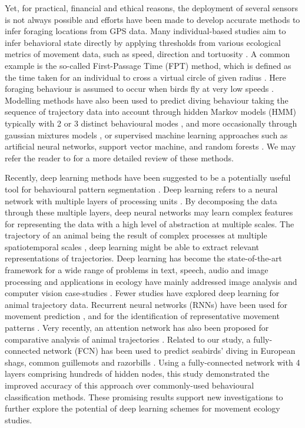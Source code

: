 \documentclass{article}
\begin{document}
Yet, for practical, financial and ethical reasons, the deployment of several sensors is not always possible and efforts have been made to develop accurate methods to infer foraging locations from GPS data. 
Many individual-based studies aim to infer behavioral state directly by applying thresholds from various ecological metrics of movement data, such as speed, direction and tortuosity \citep{dean_simultaneous_2015,seidel_ecological_2018}. 
A common example is the so-called First-Passage Time (FPT) method, which is defined as the time taken for an individual to cross a virtual circle of given radius \citep{carter_navigating_2016}. Here foraging behaviour is assumed to occur when birds fly at very low speeds \citep{weimerskirch_foraging_2008}.
Modelling methods have also been used to predict diving behaviour taking the sequence of trajectory data into account through hidden Markov models (HMM) typically with 2 or 3 distinct behavioural modes \citep{boyd_movement_2014,mcclintock_momentuhmm_2018,oppel_foraging_2015}, and more occasionally through gaussian mixtures models \citep{guilford_gps_2008,mendez_geographical_2017}, or supervised machine learning approaches such as artificial neural networks, support vector machine, and random forests \citep{guilford_migration_2009, wang_machine_2019}. We may refer the reader to 
\citep{joo_navigating_2020} for a more detailed review of these methods.

Recently, deep learning methods have been suggested to be a potentially useful tool for behavioural pattern segmentation \citep{valletta_applications_2017}.
Deep learning refers to a neural network with multiple layers of processing units \citep{lecun_deep_2015}.
By decomposing the data through these multiple layers, deep neural networks may learn complex features for representing the data with a high level of abstraction at multiple scales.
The trajectory of an animal being the result of complex processes at multiple spatiotemporal scales \citep{nathan_movement_2008}, deep learning might be able to extract relevant representations of trajectories.
Deep learning has become the state-of-the-art framework for a wide range of problems in text, speech, audio and image processing and applications in ecology have mainly addressed image analysis and computer vision case-studies \citep{weinstein_computer_2018, christin_applications_2019}. 
Fewer studies have explored deep learning for animal trajectory data.
Recurrent neural networks (RNNs) have been used for movement prediction \citep{ardakani_encoding_2017,rew_animal_2019}, and for the identification of representative movement patterns \citep{peng_deep_2019}. Very recently, an attention network has also been proposed for comparative analysis of  animal trajectories
\citep{maekawa_deep_2020}.
Related to our study, a fully-connected network (FCN) has been used to predict seabirds' diving in European shags, common guillemots and razorbills  \citep{browning_predicting_2018}. Using a fully-connected network with 4 layers comprising hundreds of hidden nodes, this study demonstrated the improved accuracy of this approach over commonly-used behavioural classification methods. These promising results support new investigations to further explore the potential of deep learning schemes for movement ecology studies.
\end{document}
